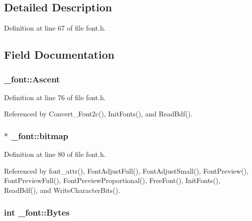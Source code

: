 \subsection{Detailed Description}


Definition at line 67 of file font.\-h.



\subsection{Field Documentation}
\hypertarget{struct__font_a998e54724f56879aa85c5ec169873f39}{
\subsubsection[{Ascent}]{ \-\_\-font\-::\-Ascent}}\label{struct__font_a998e54724f56879aa85c5ec169873f39}


Definition at line 76 of file font.\-h.



Referenced by Convert\-\_\-\-Font2c(), Init\-Fonts(), and Read\-Bdf().

\hypertarget{struct__font_a336f543c3fe3d3197c6e709fa7df0f5b}{
\subsubsection[{bitmap}]{ $\ast$ \-\_\-font\-::bitmap}}\label{struct__font_a336f543c3fe3d3197c6e709fa7df0f5b}


Definition at line 80 of file font.\-h.



Referenced by font\-\_\-attr(), Font\-Adjust\-Full(), Font\-Adjust\-Small(), Font\-Preview(), Font\-Preview\-Full(), Font\-Preview\-Proportional(), Free\-Font(), Init\-Fonts(), Read\-Bdf(), and Write\-Character\-Bits().

\hypertarget{struct__font_a13b0b0e4e91f4d663ba4c3c11bfbda8a}{
\subsubsection[{Bytes}]{\setlength{\rightskip}{0pt plus 5cm}int \-\_\-font\-::\-Bytes}}\label{struct__font_a13b0b0e4e91f4d663ba4c3c11bfbda8a}


